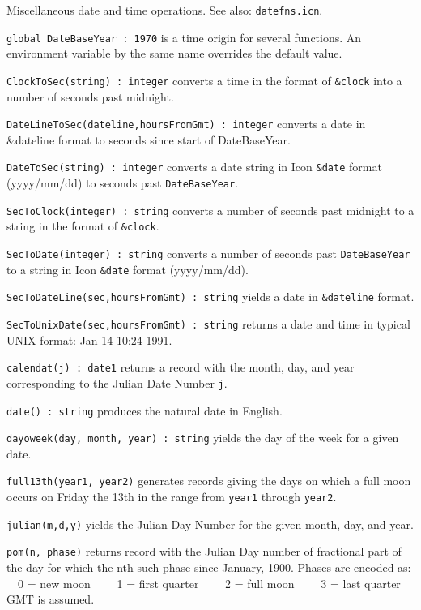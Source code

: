 Miscellaneous date and time operations. See also: \texttt{datefns.icn}.

\texttt{global DateBaseYear : 1970} is a time origin for several
functions. An environment
variable by the same name overrides the default value.

\texttt{ClockToSec(string) : integer} converts a time in the format of
\texttt{\&clock} into a number of seconds past midnight.

\texttt{DateLineToSec(dateline,hoursFromGmt) : integer} converts a date
in \&dateline format to seconds since start of DateBaseYear.

\texttt{DateToSec(string) : integer} converts a date string in Icon
\texttt{\&date} format (yyyy/mm/dd) to seconds past
\texttt{DateBaseYear}.

\texttt{SecToClock(integer) : string} converts a number of seconds past
midnight to a string in the format of \texttt{\&clock}.

\texttt{SecToDate(integer) : string} converts a number of seconds past
\texttt{DateBaseYear} to a string in Icon \texttt{\&date} format
(yyyy/mm/dd).

\texttt{SecToDateLine(sec,hoursFromGmt) : string} yields a date in
\texttt{\&dateline} format.

\texttt{SecToUnixDate(sec,hoursFromGmt) : string} returns a date and
time in typical UNIX format: Jan 14 10:24 1991.

\texttt{calendat(j) : date1} returns a record with the month, day, and
year corresponding to the Julian Date Number \texttt{j}.

\texttt{date() : string} produces the natural date in English.

\texttt{dayoweek(day, month, year) : string} yields the day of the
week for a given date.

\texttt{full13th(year1, year2)} generates records giving the days on
which a full moon occurs on Friday the 13th in the range from
\texttt{year1} through \texttt{year2}.

\texttt{julian(m,d,y)} yields the Julian Day Number for the given
month, day, and year.

\texttt{pom(n, phase)} returns record with the Julian Day number of
fractional part of the day for which the nth such phase since January,
1900. Phases are encoded as:\\
\ \ 0 = new moon \ \ \ \ 1 = first quarter \ \ \ \ 2 = full moon
\ \ \ \ 3 = last quarter\\
GMT is assumed.

